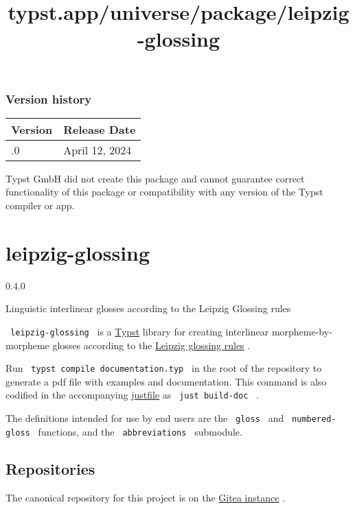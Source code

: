 \label{versions}
\subsubsection{Version history}\label{version-history}

\begin{longtable}[]{@{}ll@{}}
\toprule\noalign{}
Version & Release Date \\
\midrule\noalign{}
\endhead
\bottomrule\noalign{}
\endlastfoot
0.1.0 & April 12, 2024 \\
\end{longtable}

Typst GmbH did not create this package and cannot guarantee correct
functionality of this package or compatibility with any version of the
Typst compiler or app.


\title{typst.app/universe/package/leipzig-glossing}

\label{banner}
\section{leipzig-glossing}\label{leipzig-glossing}

{ 0.4.0 }

Linguistic interlinear glosses according to the Leipzig Glossing rules

\label{readme}
\texttt{\ leipzig-glossing\ } is a
\href{https://github.com/typst/typst}{Typst} library for creating
interlinear morpheme-by-morpheme glosses according to the
\href{https://www.eva.mpg.de/lingua/pdf/Glossing-Rules.pdf}{Leipzig
glossing rules} .

Run \texttt{\ typst\ compile\ documentation.typ\ } in the root of the
repository to generate a pdf file with examples and documentation. This
command is also codified in the accompanying
\href{https://github.com/casey/just}{justfile} as
\texttt{\ just\ build-doc\ } .

The definitions intended for use by end users are the \texttt{\ gloss\ }
and \texttt{\ numbered-gloss\ } functions, and the
\texttt{\ abbreviations\ } submodule.

\subsection{Repositories}\label{repositories}

The canonical repository for this project is on the
\href{https://code.everydayimshuflin.com/greg/typst-lepizig-glossing}{Gitea
instance} .


